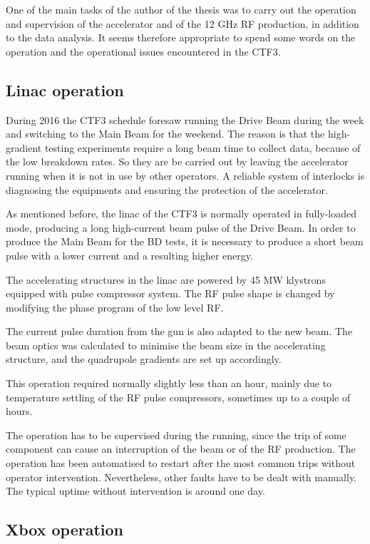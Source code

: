 One of the main tasks of the author of the thesis was to carry out the operation and supervision of the accelerator and of the 12 GHz RF production, in addition to the data analysis. It seems therefore appropriate to spend some words on the operation and the operational issues encountered in the CTF3.

\subsection{Linac operation}

During 2016 the CTF3 schedule foresaw running the Drive Beam during the week and switching to the Main Beam for the weekend. The reason is that the high-gradient testing experiments require a long beam time to collect data, because of the low breakdown rates. So they are be carried out by leaving the accelerator running when it is not in use by other operators. A reliable system of interlocks is diagnosing the equipments and ensuring the protection of the accelerator. 

As mentioned before, the linac of the CTF3 is normally operated in fully-loaded mode, producing a long  high-current beam pulse of the Drive Beam. In order to produce the Main Beam for the BD tests, it is necessary to produce a short beam pulse with a lower current and a resulting higher energy. 

The accelerating structures in the linac are powered by 45 MW klystrons equipped with pulse compressor system. 
The RF pulse shape is changed by modifying the phase program of the low level RF.

The current pulse duration from the gun is also adapted to the new beam. The beam optics was calculated to minimise the beam size in the accelerating structure, and the quadrupole gradients are set up accordingly.

This operation required normally slightly less than an hour, mainly due to temperature settling of the RF pulse compressors, sometimes up to a couple of hours.

The operation has to be supervised during the running, since the trip of some component can cause an interruption of the beam or of the RF production. The operation has been automatised to restart after the most common trips without operator intervention. Nevertheless, other faults have to be dealt with manually. The typical uptime without intervention is around one day.

\subsection{Xbox operation}
\label{sec:xboxop}

